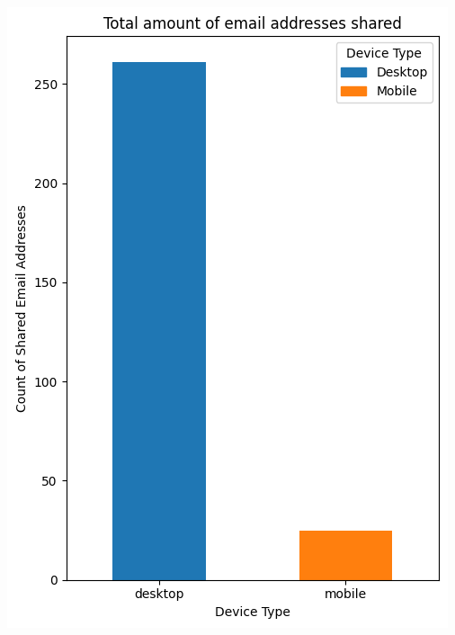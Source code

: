 \vspace{0.8cm}
\noindent 
\begin{minipage}{0.45\textwidth} 
    \includegraphics[width=\linewidth]{./assets/comparison4.png} 
\end{minipage}
\hfill 
